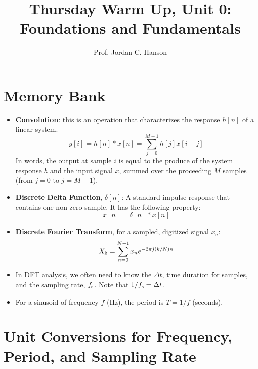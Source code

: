 \documentclass{article}
\begin{document}
\twocolumn

\title{Thursday Warm Up, Unit 0: Foundations and Fundamentals}
\author{Prof. Jordan C. Hanson}
\maketitle

\section{Memory Bank}
\small
\begin{itemize}
\item \textbf{Convolution}: this is an operation that characterizes the response $h[n]$ of a linear system.
\begin{equation}
y[i] = h[n] * x[n] = \sum_{j=0}^{M-1}h[j]x[i-j] \label{eq:conv}
\end{equation}
In words, the output at sample $i$ is equal to the produce of the system response $h$ and the input signal $x$, summed over the proceeding $M$ samples (from $j=0$ to $j=M-1$).
\item \textbf{Discrete Delta Function}, $\delta[n]$: A standard impulse response that contains one non-zero sample.  It has the following property:
\begin{equation}
x[n] = \delta[n] * x[n] \label{eq:conv2}
\end{equation}
\item \textbf{Discrete Fourier Transform}, for a sampled, digitized signal $x_n$:
\begin{equation}
X_{\rm k} = \sum_{n=0}^{N-1} x_n e^{-2\pi j (k/N) n}
\end{equation}
\item In DFT analysis, we often need to know the $\Delta t$, time duration for samples, and the sampling rate, $f_{\rm s}$.  Note that $1/f_{\rm s} = \Delta t$.
\item For a sinusoid of frequency $f$ (Hz), the period is $T = 1/f$ (seconds).
\end{itemize}

\section{Unit Conversions for Frequency, Period, and Sampling Rate}
\end{document}
